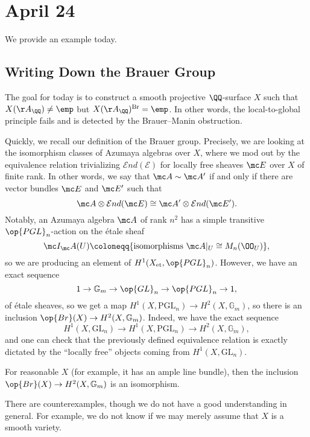 \documentclass[../notes.tex]{subfiles}
\begin{document}
\section{April 24}

We provide an example today.

\subsection{Writing Down the Brauer Group}
The goal for today is to construct a smooth projective $\QQ$-surface $X$ such that $X(\AA_\QQ)\ne\emp$ but $X(\AA_\QQ)^{\mathrm{Br}}=\emp$. In other words, the local-to-global principle fails and is detected by the Brauer--Manin obstruction.

Quickly, we recall our definition of the Brauer group. Precisely, we are looking at the isomorphism classes of Azumaya algebras over $X$, where we mod out by the equivalence relation trivializing $\mathcal End(\mathcal E)$ for locally free sheaves $\mc E$ over $X$ of finite rank. In other words, we say that $\mc A\sim\mc A'$ if and only if there are vector bundles $\mc E$ and $\mc E'$ such that
\[\mc A\otimes\mathcal End(\mc E)\cong\mc A'\otimes\mathcal End(\mc E').\]
Notably, an Azumaya algebra $\mc A$ of rank $n^2$ has a simple transitive $\op{PGL}_n$-action on the \'etale sheaf
\[\mc I_\mc A(U)\coloneqq\{\text{isomorphisms }\mc A|_U\cong M_n(\OO_U)\},\]
so we are producing an element of $H^1(X_{\mathrm{et}},{\op{PGL}_n})$. However, we have an exact sequence
\[1\to\mathbb G_m\to{\op{GL}_n}\to{\op{PGL}_n}\to1,\]
of \'etale sheaves, so we get a map $H^1(X,\mathrm{PGL}_n)\to H^2(X,\mathbb G_m)$, so there is an inclusion $\op{Br}(X)\to H^2(X,\mathbb G_m)$. Indeed, we have the exact sequence
\[H^1(X,\mathrm{GL}_n)\to H^1(X,\mathrm{PGL}_n)\to H^2(X,\mathbb G_m),\]
and one can check that the previously defined equivalence relation is exactly dictated by the ``locally free'' objects coming from $H^1(X,\mathrm{GL}_n)$.
\begin{theorem}
	For reasonable $X$ (for example, it has an ample line bundle), then the inclusion $\op{Br}(X)\to H^2(X,\mathbb G_m)$ is an isomorphism.
\end{theorem}
There are counterexamples, though we do not have a good understanding in general. For example, we do not know if we may merely assume that $X$ is a smooth variety.
\end{document}
